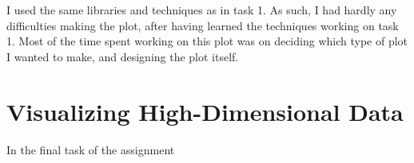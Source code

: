 \documentclass[11pt,a4paper,titlepage]{article}
\begin{document}
I used the same libraries and techniques as in task 1. As such, I had hardly any difficulties making the plot, after having learned the techniques working on task 1. Most of the time spent working on this plot was on deciding which type of plot I wanted to make, and designing the plot itself.

\section{Visualizing High-Dimensional Data}

In the final task of the assignment


\end{document}
